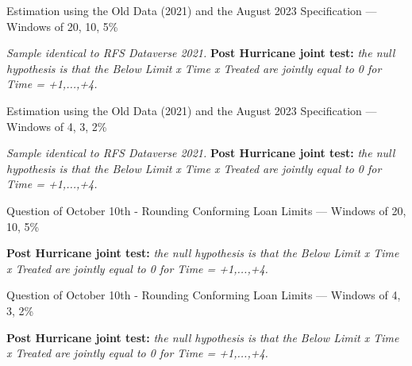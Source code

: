 \documentclass{article}
\begin{document}
\begin{sidewaystable}
        
    \caption{Estimation using the Old Data (2021) and the August 2023 Specification --- Windows of 20, 10, 5\%}

    \begin{center}
    
    \end{center}

    \emph{Sample identical to RFS Dataverse 2021.}
    \textbf{Post Hurricane joint test:} \emph{the null hypothesis is that the Below Limit x Time x Treated are jointly equal to 0 for Time = +1,...,+4.}


\end{sidewaystable}

\begin{sidewaystable}
        
    \caption{Estimation using the Old Data (2021) and the August 2023 Specification --- Windows of 4, 3, 2\%}

    \begin{center}
    
    \end{center}

    \emph{Sample identical to RFS Dataverse 2021.} 
    \textbf{Post Hurricane joint test:} \emph{the null hypothesis is that the Below Limit x Time x Treated are jointly equal to 0 for Time = +1,...,+4.}


\end{sidewaystable}

\begin{sidewaystable}
                    
    \caption{Question of October 10th - Rounding Conforming Loan Limits --- Windows of 20, 10, 5\%}

    \begin{center}
    
    \end{center}
                 
    \textbf{Post Hurricane joint test:} \emph{the null hypothesis is that the Below Limit x Time x Treated are jointly equal to 0 for Time = +1,...,+4.}
   
\end{sidewaystable}

\begin{sidewaystable}
                    
    \caption{Question of October 10th - Rounding Conforming Loan Limits --- Windows of 4, 3, 2\%}

    \begin{center}
    
    \end{center}
                 
    \textbf{Post Hurricane joint test:} \emph{the null hypothesis is that the Below Limit x Time x Treated are jointly equal to 0 for Time = +1,...,+4.}
   
\end{sidewaystable}
 
\end{document}
